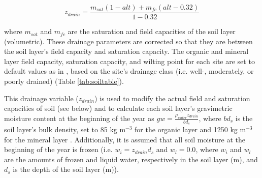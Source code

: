 \documentclass[a4paper, 12pt] {report}
\begin{document}
\begin{equation}
z_{drain} = \frac{m_{sat}(1 - alt) + m_{fc}(alt - 0.32)}{1 - 0.32}
\end{equation}

where $m_{sat}$ and $m_{fc}$ are the saturation and field capacities of the soil layer (volumetric). These drainage parameters are corrected so that they are between the soil layer's field capacity and saturation capacity. The organic and mineral layer field capacity, saturation capacity, and wilting point for each site are set to default values as in , based on the site's drainage class (i.e. well-, moderately, or poorly drained) (Table \ref{tab:soiltable}).

\begin{table}
  \begin{center}
    \caption{Input soil parameters (volumetric). Values taken from \protect{}.}
    \label{tab:soiltable}
  \end{center}
\end{table}

This drainage variable ($z_{drain}$) is used to modify the actual field and saturation capacities of soil (see below) and to calculate each soil layer's gravimetric moisture content at the beginning of the year as $gw = \frac{\rho_{water}z_{drain}}{bd_s}$, where $bd_s$ is the soil layer's bulk density, set to 85 kg m$^{-3}$ for the organic layer and 1250 kg m$^{-3}$ for the mineral layer \cite{bonanComputerModelSolar1989}. Additionally,  it is assumed that all soil moisture at the beginning of the year is frozen (i.e. $w_i = z_{drain}d_s$ and $w_l = 0.0$, where $w_i$ and $w_l$ are the amounts of frozen and liquid water, respectively in the soil layer (m), and $d_s$ is the depth of the soil layer (m)).
\end{document}
